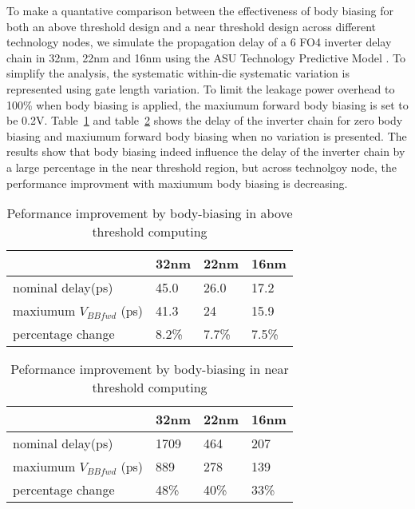 To make a quantative comparison between the effectiveness of body biasing for both an
above threshold design and a near threshold design across different technology
nodes,  we simulate the propagation  delay of a 6 FO4 inverter delay chain in
32nm, 22nm and 16nm using the ASU Technology Predictive Model \cite{PredictiveModel}. To simplify the
analysis, the systematic within-die systematic variation is represented using gate length variation. To limit the leakage power overhead to 100\% when body biasing is applied, the maxiumum forward body biasing is set to be 0.2V.  Table~\ref{body1} and table~\ref{body2} shows the delay of the inverter chain for zero body biasing and maxiumum forward body biasing when no variation is presented. The results show that body biasing indeed influence the delay of the inverter chain by a large percentage in the near threshold region, but across technolgoy node, the performance improvment with maxiumum body biasing is decreasing.   


\begin{table}
  \caption {Peformance improvement by body-biasing in above threshold computing} 
  \centering 
  \label {body1}
  \begin{tabular}{ | l | l | l | l | }
    \hline
    & 32nm & 22nm & 16nm \\ \hline
    nominal delay(ps) & 45.0 & 26.0 & 17.2 \\ \hline
    maxiumum $V_{BBfwd}$ (ps)  & 41.3 & 24 & 15.9 \\  \hline
    percentage change  & 8.2\% & 7.7\% & 7.5\% \\ 
    \hline
  \end{tabular}
\end{table}



\begin{table}
  \caption {Peformance improvement by body-biasing in near threshold computing}  
  \centering
  \label {body2}
  \begin{tabular}{ | l | l | l | l | }
    \hline
    & 32nm & 22nm & 16nm \\ \hline
    nominal delay(ps) & 1709 & 464 & 207 \\ \hline
    maxiumum $V_{BBfwd}$ (ps)  & 889 & 278 & 139 \\  \hline
    percentage change  & 48\% & 40\% & 33\% \\ 
    \hline
  \end{tabular}
\end{table}


